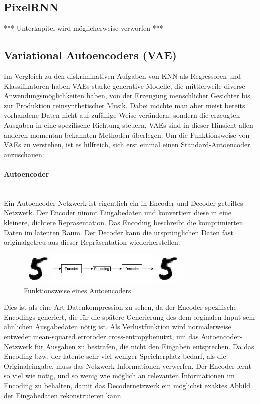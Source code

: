 \subsection{PixelRNN}\label{PixelRNN}

*** Unterkapitel wird möglicherweise verworfen ***

\subsection{Variational Autoencoders (VAE)}\label{Variational Autoencoders (VAE)}
Im Vergleich zu den diskriminativen Aufgaben von KNN als Regressoren und Klassifikatoren haben VAEs starke generative Modelle, die mittlerweile diverse Anwendungsmöglichkeiten haben, von der Erzeugung menschlicher Gesichter bis zur Produktion reinsynthetischer Musik. Dabei möchte man aber meist bereits vorhandene Daten nicht auf zufällige Weise verändern, sondern die erzeugten Ausgaben in eine spezifische Richtung steuern. VAEs sind in dieser Hinsicht allen anderen momentan bekannten Methoden überlegen. Um die Funktionsweise von VAEs zu verstehen, ist es hilfreich, sich erst einmal einen Standard-Autoencoder anzuschauen:

\paragraph{Autoencoder}~\\
Ein Autoencoder-Netzwerk ist eigentlich ein in Encoder und Decoder geteiltes Netzwerk. Der Encoder nimmt Eingabedaten und konvertiert diese in eine kleinere, dichtere Repräsentation. Das Encoding beschreibt die komprimierten Daten im latenten Raum. Der Decoder kann die ursprünglichen Daten fast originalgetreu aus dieser Repräsentation wiederherstellen.
\begin{figure}[htb]
    \centering
    \includegraphics[width=0.75\textwidth,angle=0]{abb/autoencoder_standard}
    \caption[Autoencoder]{Funktionsweise eines Autoencoders}
\end{figure}
Dies ist als eine Art Datenkompression zu sehen, da der Encoder spezifische Encodings generiert, die für die spätere Generierung des dem orginalen Input sehr ähnlichen Ausgabedaten nötig ist. Als Verlustfunktion wird normalerweise entweder \frqq mean-squared error\flqq oder \frqq cross-entropy\flqq benutzt, um das Autoencoder-Netzwerk für Ausgaben zu bestrafen, die nicht den Eingaben entsprechen.
Da das Encoding bzw. der latente sehr viel weniger Speicherplatz bedarf, als die Originaleingabe, muss das Netzwerk Informationen verwerfen. Der Encoder lernt so viel wie nötig, und so wenig wie möglich an relevanten Informationen im Encoding zu behalten, damit das Decodernetzwerk ein möglichst exaktes Abbild der Eingabedaten rekonstruieren kann.

